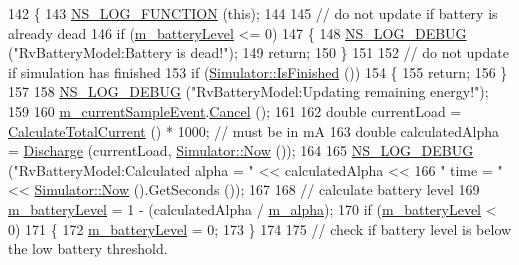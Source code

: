 \begin{DoxyCode}
142 \{
143   \hyperlink{log-macros-disabled_8h_a90b90d5bad1f39cb1b64923ea94c0761}{NS\_LOG\_FUNCTION} (\textcolor{keyword}{this});
144 
145   \textcolor{comment}{// do not update if battery is already dead}
146   \textcolor{keywordflow}{if} (\hyperlink{classns3_1_1RvBatteryModel_af8c48353c513a2279115e52927b479a0}{m\_batteryLevel} <= 0)
147     \{
148       \hyperlink{group__logging_ga413f1886406d49f59a6a0a89b77b4d0a}{NS\_LOG\_DEBUG} (\textcolor{stringliteral}{"RvBatteryModel:Battery is dead!"});
149       \textcolor{keywordflow}{return};
150     \}
151 
152   \textcolor{comment}{// do not update if simulation has finished}
153   \textcolor{keywordflow}{if} (\hyperlink{classns3_1_1Simulator_aa8c662d04480705d09b3d65b4dea9d2f}{Simulator::IsFinished} ())
154     \{
155       \textcolor{keywordflow}{return};
156     \}
157 
158   \hyperlink{group__logging_ga413f1886406d49f59a6a0a89b77b4d0a}{NS\_LOG\_DEBUG} (\textcolor{stringliteral}{"RvBatteryModel:Updating remaining energy!"});
159 
160   \hyperlink{classns3_1_1RvBatteryModel_a3eb7ced1023c82a8a4714d46e8a97342}{m\_currentSampleEvent}.\hyperlink{classns3_1_1EventId_a993ae94e48e014e1afd47edb16db7a11}{Cancel} ();
161 
162   \textcolor{keywordtype}{double} currentLoad = \hyperlink{classns3_1_1EnergySource_ac8b121ba1389d5545705e52d1a6fd602}{CalculateTotalCurrent} () * 1000; \textcolor{comment}{// must be in mA}
163   \textcolor{keywordtype}{double} calculatedAlpha = \hyperlink{classns3_1_1RvBatteryModel_a5e485e8966bad557ccb11f6a459e2a8d}{Discharge} (currentLoad, \hyperlink{classns3_1_1Simulator_ac3178fa975b419f7875e7105be122800}{Simulator::Now} ());
164 
165   \hyperlink{group__logging_ga413f1886406d49f59a6a0a89b77b4d0a}{NS\_LOG\_DEBUG} (\textcolor{stringliteral}{"RvBatteryModel:Calculated alpha = "} << calculatedAlpha <<
166                 \textcolor{stringliteral}{" time = "} << \hyperlink{classns3_1_1Simulator_ac3178fa975b419f7875e7105be122800}{Simulator::Now} ().GetSeconds ());
167 
168   \textcolor{comment}{// calculate battery level}
169   \hyperlink{classns3_1_1RvBatteryModel_af8c48353c513a2279115e52927b479a0}{m\_batteryLevel} = 1 - (calculatedAlpha / \hyperlink{classns3_1_1RvBatteryModel_af1cad7267993108628a0a9d8ad622212}{m\_alpha});
170   \textcolor{keywordflow}{if} (\hyperlink{classns3_1_1RvBatteryModel_af8c48353c513a2279115e52927b479a0}{m\_batteryLevel} < 0)
171     \{
172       \hyperlink{classns3_1_1RvBatteryModel_af8c48353c513a2279115e52927b479a0}{m\_batteryLevel} = 0;
173     \}
174 
175   \textcolor{comment}{// check if battery level is below the low battery threshold.}

\end{DoxyCode}
